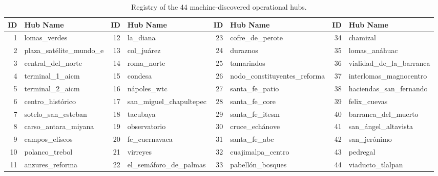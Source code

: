 \begin{table}[H]
    \centering
    \fontsize{6.5}{7.5}\selectfont %
    \setlength{\tabcolsep}{3pt}
    \begin{tabular}{rl | rl | rl | rl}
        \toprule
        \textbf{ID} & \textbf{Hub Name} & \textbf{ID} & \textbf{Hub Name} & \textbf{ID} & \textbf{Hub Name} & \textbf{ID} & \textbf{Hub Name} \\
        \midrule
        1 & lomas\_verdes & 12 & la\_diana & 23 & cofre\_de\_perote & 34 & chamizal \\
        2 & plaza\_satélite\_mundo\_e & 13 & col\_juárez & 24 & duraznos & 35 & lomas\_anáhuac \\
        3 & central\_del\_norte & 14 & roma\_norte & 25 & tamarindos & 36 & vialidad\_de\_la\_barranca \\
        4 & terminal\_1\_aicm & 15 & condesa & 26 & nodo\_constituyentes\_reforma & 37 & interlomas\_magnocentro \\
        5 & terminal\_2\_aicm & 16 & nápoles\_wtc & 27 & santa\_fe\_patio & 38 & haciendas\_san\_fernando \\
        6 & centro\_histórico & 17 & san\_miguel\_chapultepec & 28 & santa\_fe\_core & 39 & felix\_cuevas \\
        7 & sotelo\_san\_esteban & 18 & tacubaya & 29 & santa\_fe\_itesm & 40 & barranca\_del\_muerto \\
        8 & carso\_antara\_miyana & 19 & observatorio & 30 & cruce\_echánove & 41 & san\_ángel\_altavista \\
        9 & campos\_elíseos & 20 & fc\_cuernavaca & 31 & santa\_fe\_abc & 42 & san\_jerónimo \\
        10 & polanco\_trebol & 21 & virreyes & 32 & cuajimalpa\_centro & 43 & pedregal \\
        11 & anzures\_reforma & 22 & el\_semáforo\_de\_palmas & 33 & pabellón\_bosques & 44 & viaducto\_tlalpan \\
        \bottomrule
    \end{tabular}
    \caption{Registry of the 44 machine-discovered operational hubs.}
    \label{tab:hdbscan_dictionary}
\end{table}


